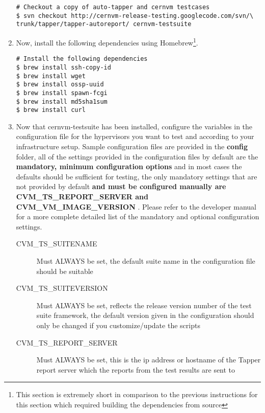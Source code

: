 \begin{enumerate}
\begin{lstlisting}
# Checkout a copy of auto-tapper and cernvm testcases
$ svn checkout http://cernvm-release-testing.googlecode.com/svn/\
trunk/tapper/tapper-autoreport/ cernvm-testsuite
\end{lstlisting}

\item        Now, install the following dependencies using Homebrew\footnote{This section is extremely short in comparison to the previous
                instructions for this section which required building the dependencies from source}.
                
\lstset{language=bash,caption=Install Dependencies}
\begin{lstlisting}
# Install the following dependencies
$ brew install ssh-copy-id
$ brew install wget
$ brew install ossp-uuid
$ brew install spawn-fcgi
$ brew install md5sha1sum
$ brew install curl
\end{lstlisting}

\item	Now that cernvm-testsuite has been installed, configure the variables in the configuration file for the
			hypervisors you want to test and according to your \tapper infrastructure setup. Sample configuration files are provided
			in the {\bf config} folder, all of the settings provided in the configuration files by default are the {\bf mandatory, minimum 
			configuration options} and in most cases the	defaults should be sufficient for testing, the only mandatory settings that are
			not provided by default {\bf and must be configured manually are CVM\_TS\_REPORT\_SERVER and 
			CVM\_VM\_IMAGE\_VERSION }. Please refer to the developer manual for a more complete detailed list of the mandatory and 
			optional configuration settings.

\begin{description}
\item[CVM\_TS\_SUITENAME]	Must ALWAYS be set, the default suite name in the configuration file should be suitable

	  		  
\item[CVM\_TS\_SUITEVERSION] 	Must ALWAYS be set, reflects the release version number of the test suite framework, the  default
								version given in the configuration should only be changed if you customize/update the scripts

\item[CVM\_TS\_REPORT\_SERVER]	Must ALWAYS be set, this is the ip address or hostname of the Tapper report server which the reports
      							from the test results are sent to
		

\end{description}
\end{enumerate}
